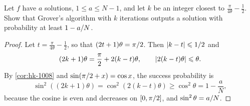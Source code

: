 \begin{exercisebox}
%
\begin{exercise}\label{ex:iterations-1008}\label{thm:iterations-1008}
    Let $f$ have $a$ solutions, $1 \leq a \leq N - 1$, and let $k$ be an integer closest to
    $\frac{\pi}{4\theta} - \frac{1}{2}$. Show that Grover's algorithm with $k$ iterations outputs a
    solution with probability at least $1 - a/N$.
\end{exercise}
\tcblower
\begin{proof}
    Let $t = \frac{\pi}{4\theta} - \frac{1}{2}$, so that $(2t+1)\theta = \pi/2$. Then
    $\left\lvert k - t\right\rvert \leqslant 1/2$ and
    \[(2k+1)\theta = \frac{\pi}{2} + 2(k-t)\theta, \qquad \left\lvert2(k-t)\theta\right\rvert \leqslant \theta.\]
    By \cref{cor:hk-1008} and $\sin(\pi/2 + x) = \cos x$, the success probability is
    \[\sin^2\left((2k+1)\theta\right) = \cos^2\left(2(k-t)\theta\right) \geq \cos^2\theta = 1 - \frac{a}{N},\]
    because the cosine is even and decreases on $[0, \pi/2]$, and $\sin^2\theta = a/N$.
\end{proof}
\end{exercisebox}


